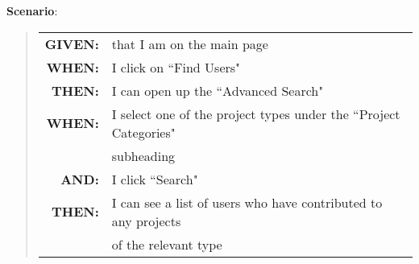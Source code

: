 \documentclass[12pt]{article}
\newcommand{\GivenSc} {
	\noindent \textbf{GIVEN:}
	}
\newcommand{\WhenSc} {
	\noindent \textbf{WHEN:}
	}
\newcommand{\AndSc} {
	\noindent \textbf{AND:}
	}
\newcommand{\ThenSc} {
	\noindent \textbf{THEN:}
	}
\begin{document}
\begin{framed}
\noindent \textbf{Scenario}:
\begin{quote}
\begin{tabular}{rl}
\GivenSc & that I am on the main page\\
\WhenSc  & I click on ``Find Users"\\
\ThenSc  & I can open up the ``Advanced Search"\\
\WhenSc  & I select one of the project types under the ``Project Categories"\\
         & subheading\\ 
\AndSc   & I click ``Search"\\
\ThenSc  & I can see a list of users who have contributed to any projects \\
         & of the relevant type
\end{tabular}
\end{quote}
\end{framed}


\end{document}
